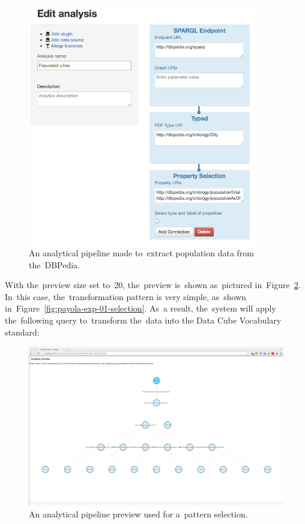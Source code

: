 \begin{figure}
  \centering
  \includegraphics[width=100mm]{img/payola-exp-01-step1.png}
  \caption{An analytical pipeline made to~extract population data from the~DBPedia.}
  \label{fig:dbpedia-pop-anal}
\end{figure}

With the~preview size set to~20, the~preview is~shown as~pictured in~Figure~\ref{fig:payola-exp-01-preview}. In~this case, the~transformation pattern 
is very simple, as~shown in~Figure~\ref{fig:payola-exp-01-selection}. As~a 
result, the~system will apply the~following query to~transform the~data into the
Data Cube Vocabulary standard:

\begin{figure}
  \centering
  \includegraphics[width=140mm]{img/payola-exp-01-preview.png}
  \caption{An analytical pipeline preview used for a~pattern selection.}
  \label{fig:payola-exp-01-preview}
\end{figure}

